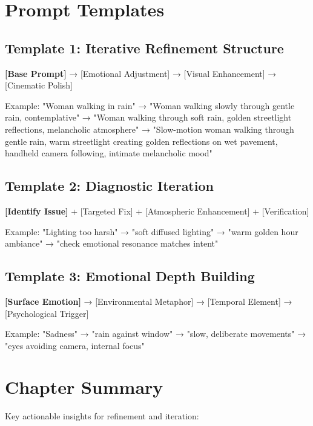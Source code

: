 \section*{Prompt Templates}

\subsection*{Template 1: Iterative Refinement Structure}
\begin{Prompt}
\textbf{[Base Prompt]} → [Emotional Adjustment] → [Visual Enhancement] → [Cinematic Polish]

Example: "Woman walking in rain" → "Woman walking slowly through gentle rain, contemplative" → "Woman walking through soft rain, golden streetlight reflections, melancholic atmosphere" → "Slow-motion woman walking through gentle rain, warm streetlight creating golden reflections on wet pavement, handheld camera following, intimate melancholic mood"
\end{Prompt}

\subsection*{Template 2: Diagnostic Iteration}
\begin{Prompt}
\textbf{[Identify Issue]} + [Targeted Fix] + [Atmospheric Enhancement] + [Verification]

Example: "Lighting too harsh" → "soft diffused lighting" → "warm golden hour ambiance" → "check emotional resonance matches intent"
\end{Prompt}

\subsection*{Template 3: Emotional Depth Building}
\begin{Prompt}
\textbf{[Surface Emotion]} → [Environmental Metaphor] → [Temporal Element] → [Psychological Trigger]

Example: "Sadness" → "rain against window" → "slow, deliberate movements" → "eyes avoiding camera, internal focus"
\end{Prompt}

\section*{Chapter Summary}

Key actionable insights for refinement and iteration:

